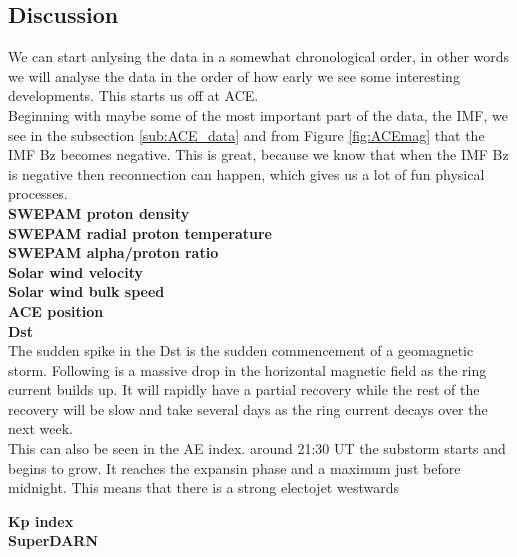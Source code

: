 \documentclass[norsk,a4paper,12pt]{article}
\begin{document}
\begin{multicols}{2}


\section{Discussion} %
\label{sec:discussion}
We can start anlysing the data in a somewhat chronological order, in other words we will analyse the data in the order of how early we see some interesting developments. This starts us off at ACE.\\

Beginning with maybe some of the most important part of the data, the IMF, we see in the subsection \ref{sub:ACE_data} and from Figure \ref{fig:ACEmag} that the IMF Bz becomes negative. This is great, because we know that when the IMF Bz is negative then reconnection can happen, which gives us a lot of fun physical processes. 
\\


\textbf{SWEPAM proton density}\\


\textbf{SWEPAM radial proton temperature}\\


\textbf{SWEPAM alpha/proton ratio}\\


\textbf{Solar wind velocity}\\


\textbf{Solar wind bulk speed}\\


\textbf{ACE position}\\


\textbf{Dst}\\
The sudden spike in the Dst is the sudden commencement of a geomagnetic storm. Following is a massive drop in the horizontal magnetic field as the ring current builds up. It will rapidly have a partial recovery while the rest of the recovery will be slow and take several days as the ring current decays over the next week. 
\\
This can also be seen in the AE index. around 21:30 UT the substorm starts and begins to grow. It reaches the expansin phase and a maximum just before midnight. This means that there is a strong electojet westwards



\textbf{Kp index}\\


\textbf{SuperDARN}\\



\end{multicols}
\end{document}
